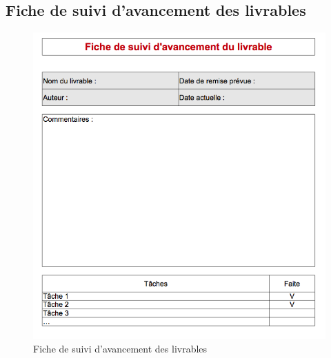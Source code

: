 \subsection{Fiche de suivi d'avancement des livrables}
\begin{figure}[h]
    \centering
    \includegraphics[width=140mm]{images/fiche_de_suivi_davancement_des_livrables.png}
    \caption{Fiche de suivi d'avancement des livrables}
\end{figure}

\pagebreak
